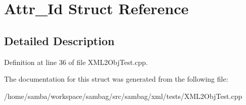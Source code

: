 \hypertarget{struct_attr___id}{
\section{Attr\_\-Id Struct Reference}
\label{struct_attr___id}
}


\subsection{Detailed Description}


Definition at line 36 of file XML2ObjTest.cpp.



The documentation for this struct was generated from the following file:\begin{DoxyCompactItemize}
\item 
/home/samba/workspace/sambag/src/sambag/xml/tests/XML2ObjTest.cpp\end{DoxyCompactItemize}
